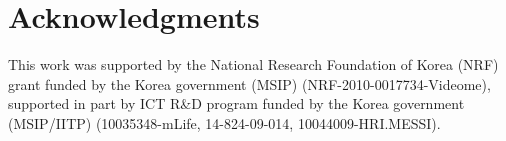 \documentclass[10pt,letterpaper]{article}
\begin{document}
\section{Acknowledgments}

This work was supported by the National Research Foundation of Korea (NRF) grant funded by the Korea government (MSIP) (NRF-2010-0017734-Videome),
supported in part by ICT R\&D program funded by the Korea government (MSIP/IITP) (10035348-mLife, 14-824-09-014, 10044009-HRI.MESSI).



\setlength{\bibleftmargin}{.125in}
\setlength{\bibindent}{-\bibleftmargin}


\end{document}
